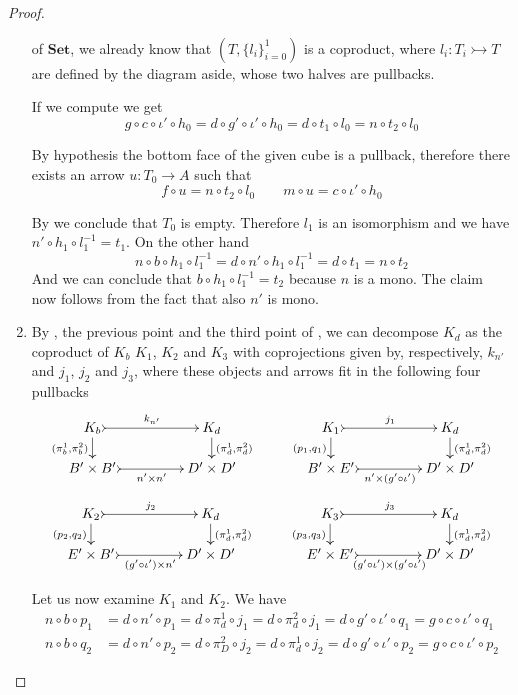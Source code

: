 \documentclass[a4paper,UKenglish,cleveref,pdftex,amsthm,thm-restate,numberwithinsect]{cas-sc}
\theoremstyle{plain}
\theoremstyle{definition}
\newcommand{\Set}{\mathbf{Set}}
\newcommand{\mto}{\rightarrowtail}
\begin{document}
\begin{proof}
\begin{enumerate}
		\noindent\parbox{9.5cm}{ of $\Set$, we already know that $(T, \{l_i\}_{i=0}^1)$ is a coproduct, where $l_i\colon T_i\mto T$ are defined by the diagram aside, whose two halves are pullbacks. }\hfill\parbox{4cm}{}
		
		If we compute we get
		\[g\circ c \circ \iota' \circ h_0=d\circ g'\circ \iota' \circ h_0=d\circ t_1\circ l_0=n\circ t_2\circ l_0\]
		
		By hypothesis the bottom face of the given cube is a pullback, therefore there exists an arrow $u\colon T_0\to A$ such that 
		\[f\circ u=n\circ t_2\circ l_0 \qquad m\circ u=c\circ \iota'\circ h_0\]
		
	By  we conclude that $T_0$ is empty. Therefore $l_1$ is an isomorphism and we have $n'\circ h_1\circ l^{-1}_1=t_1$. On the other hand
\[n\circ b\circ h_1\circ l^{-1}_1=d\circ n'\circ h_1\circ l^{-1}_1=d\circ t_1=n\circ t_2\]
And we can conclude that $b\circ h_1\circ l^{-1}_1=t_2$ because $n$ is a mono. The claim now follows from the fact that  also $n'$ is mono.
		
		\item 	 By , the previous point and the third point of , we can decompose $K_d$ as the coproduct of $K_b$ $K_1$, $K_2$ and $K_3$ with coprojections given by, respectively, $k_{n'}$ and $j_1$, $j_2$ and $j_3$, where these objects and arrows fit in the following four pullbacks
		\[\xymatrix@C=45pt@R=15pt{K_b \ar@{>->}[r]^{k_{n'}}  \ar[d]_{(\pi^1_b, \pi^2_b)}& K_d   \ar[d]^{(\pi^1_d, \pi^2_d)}& K_1 \ar@{>->}[r]^{j_1}  \ar[d]_{(p_1, q_1)} & K_d \ar[d]^{(\pi^1_d, \pi^2_d)} \\
			B'\times B' \ar@{>->}[r]_-{n'\times n'} & D'\times D' & B'\times E' \ar@{>->}[r]_-{n'\times (g'\circ \iota')} & D'\times D'}\]
		\[ \xymatrix@C=45pt@R=15pt{K_2 \ar@{>->}[r]^{j_2}  \ar[d]_{(p_2, q_2)}& K_d   \ar[d]^{(\pi^1_d, \pi^2_d)}& K_3 \ar@{>->}[r]^{j_3}  \ar[d]_{(p_3, q_3)} & K_d \ar[d]^{(\pi^1_d, \pi^2_d)} \\
			E'\times B' \ar@{>->}[r]_-{(g'\circ \iota') \times n'} & D'\times D' & E'\times E' \ar@{>->}[r]_-{(g'\circ \iota')\times (g'\circ \iota')} & D'\times D'}\]

Let us now examine $K_1$ and $K_2$. We have
\begin{align*}
	n\circ b\circ p_1&=d\circ n'\circ p_1=d\circ \pi^1_d\circ j_1=d\circ \pi^2_d\circ j_1=d\circ g'\circ \iota'\circ q_1=g\circ c \circ \iota'\circ q_1\\
	n\circ b\circ q_2 &=d\circ n'\circ p_2=d\circ\pi^2_D\circ j_2
	=d\circ \pi^1_d\circ j_2=d\circ g'\circ \iota'\circ p_2 = g\circ c \circ \iota'\circ p_2
\end{align*}


\end{enumerate}
\end{proof}
\end{document}
